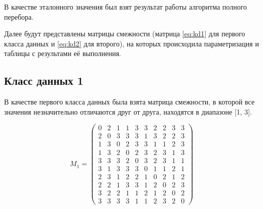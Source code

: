 В качестве эталонного значения был взят результат работы алгоритма полного перебора. 

Далее будут представлены матрицы смежности (матрица \ref{eq:kd1} для первого класса данных и \ref{eq:kd2} для второго), на которых происходила параметризация и таблицы с результами её выполнения.

\subsection{Класс данных 1}

В качестве первого класса данных была взята матрица смежности, в которой все значения незначительно отличаются друг от друга, находятся в диапазоне [1, 3].

\begin{equation}
    \label{eq:kd1}
	M_{1} = \begin{pmatrix}
		0 & 2 & 1 & 1 & 3 & 3 & 2 & 2 & 3 & 3 \\
		2 & 0 & 3 & 3 & 3 & 1 & 3 & 2 & 2 & 3 \\
		1 & 3 & 0 & 2 & 3 & 3 & 1 & 1 & 2 & 3 \\
		1 & 3 & 2 & 0 & 2 & 3 & 2 & 3 & 1 & 3 \\
		3 & 3 & 3 & 2 & 0 & 3 & 2 & 3 & 1 & 1 \\
		3 & 1 & 3 & 3 & 3 & 0 & 1 & 1 & 2 & 1 \\
		2 & 3 & 1 & 2 & 2 & 1 & 0 & 2 & 1 & 2 \\
		2 & 2 & 1 & 3 & 3 & 1 & 2 & 0 & 2 & 3 \\
		3 & 2 & 2 & 1 & 1 & 2 & 1 & 2 & 0 & 2 \\
		3 & 3 & 3 & 3 & 1 & 1 & 2 & 3 & 2 & 0 
	\end{pmatrix}
\end{equation}

\clearpage


